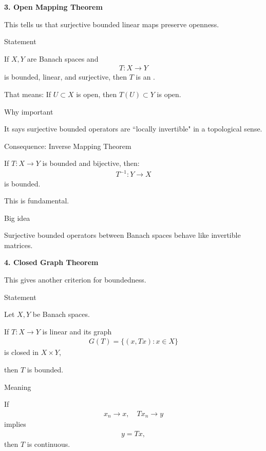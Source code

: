 \documentclass[12pt,a4paper]{report}
\begin{document}
\begin{description}
\item \textbf{3. Open Mapping Theorem}

This tells us that surjective bounded linear maps preserve openness.

	\begin{description}
    \item Statement

If $X,Y$ are Banach spaces and
\begin{align*}
T:X\to Y
\end{align*}
is bounded, linear, and surjective, then $T$ is an .

That means:
If $U\subset X$ is open, then $T(U)\subset Y$ is open.

    \item Why important

It says surjective bounded operators are ``locally invertible" in a topological sense.

    \item Consequence: Inverse Mapping Theorem

If $T:X\to Y$ is bounded and bijective, then:
\begin{align*}
T^{-1}:Y\to X
\end{align*}
is bounded.

This is fundamental.

    \item Big idea

\> Surjective bounded operators between Banach spaces behave like invertible matrices.
	\end{description}

\item \textbf{4. Closed Graph Theorem}

This gives another criterion for boundedness.

	\begin{description}
    \item Statement

Let $X,Y$ be Banach spaces.

If $T:X\to Y$ is linear and its graph
\begin{align*}
G(T)=\{(x,Tx):x\in X\}
\end{align*}
is closed in $X\times Y$,

then $T$ is bounded.

    \item Meaning

If
\begin{align*}
x_n\to x,\quad Tx_n\to y
\end{align*}
implies
\begin{align*}
y=Tx,
\end{align*}
then $T$ is continuous.


\end{description}
\end{description}
\end{document}
